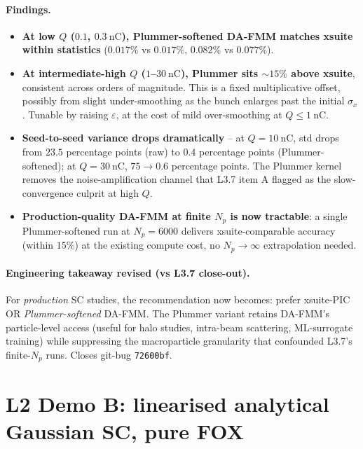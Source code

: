 \documentclass[11pt]{article}
\begin{document}
\paragraph{Findings.}
\begin{itemize}
\item \textbf{At low $Q$ ($0.1$, $0.3~\mathrm{nC}$), Plummer-softened
      DA-FMM matches xsuite within statistics} ($0.017\%$ vs $0.017\%$,
      $0.082\%$ vs $0.077\%$).
\item \textbf{At intermediate-high $Q$ ($1$--$30~\mathrm{nC}$), Plummer
      sits $\sim 15\%$ above xsuite}, consistent across orders of
      magnitude. This is a fixed multiplicative offset, possibly from
      slight under-smoothing as the bunch enlarges past the initial
      $\sigma_x$. Tunable by raising $\varepsilon$, at the cost of mild
      over-smoothing at $Q \leq \SI{1}{\nano\coulomb}$.
\item \textbf{Seed-to-seed variance drops dramatically} -- at
      $Q=\SI{10}{\nano\coulomb}$, std drops from $23.5$ percentage
      points (raw) to $0.4$ percentage points (Plummer-softened); at
      $Q=\SI{30}{\nano\coulomb}$, $75 \to 0.6$ percentage points.
      The Plummer kernel removes the noise-amplification channel that
      L3.7 item A flagged as the slow-convergence culprit at high $Q$.
\item \textbf{Production-quality DA-FMM at finite $N_p$ is now
      tractable}: a single Plummer-softened run at $N_p=6000$ delivers
      xsuite-comparable accuracy (within $15\%$) at the existing
      compute cost, no $N_p \to \infty$ extrapolation needed.
\end{itemize}

\paragraph{Engineering takeaway revised (vs L3.7 close-out).}
For \emph{production} SC studies, the recommendation now becomes:
prefer xsuite-PIC OR \emph{Plummer-softened} DA-FMM. The Plummer
variant retains DA-FMM's particle-level access (useful for halo
studies, intra-beam scattering, ML-surrogate training) while
suppressing the macroparticle granularity that confounded L3.7's
finite-$N_p$ runs. Closes git-bug \texttt{72600bf}.

\section{L2 Demo B: linearised analytical Gaussian SC, pure FOX}
\end{document}

